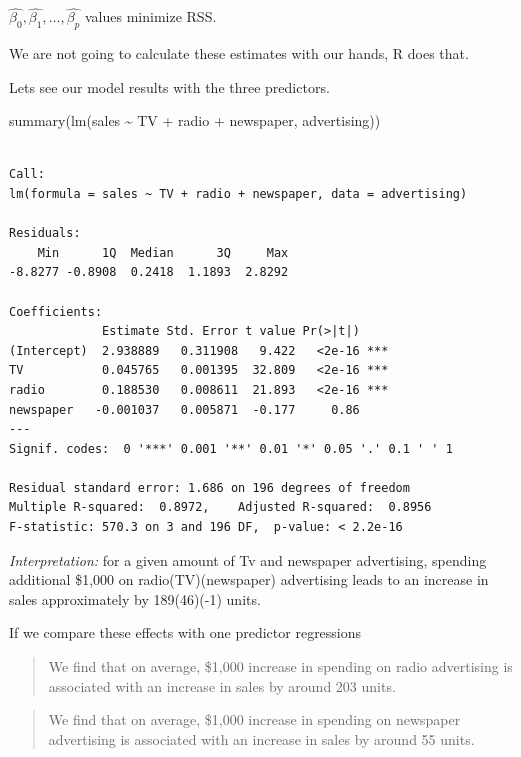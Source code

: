 \documentclass[
  letterpaper,
  DIV=11,
  numbers=noendperiod]{scrreprt}
\newenvironment{Shaded}{\begin{snugshade}}{\end{snugshade}}
\newcommand{\FunctionTok}[1]{\textcolor[rgb]{0.28,0.35,0.67}{#1}}
\newcommand{\NormalTok}[1]{\textcolor[rgb]{0.00,0.23,0.31}{#1}}
\newcommand{\SpecialCharTok}[1]{\textcolor[rgb]{0.37,0.37,0.37}{#1}}
\begin{document}
\(\hat{\beta_0}, \hat{\beta_1},\dots, \hat{\beta_p}\) values minimize
RSS.

We are not going to calculate these estimates with our hands, R does
that.

Lets see our model results with the three predictors.

\begin{Shaded}
\begin{Highlighting}[]
\FunctionTok{summary}\NormalTok{(}\FunctionTok{lm}\NormalTok{(sales }\SpecialCharTok{\textasciitilde{}}\NormalTok{ TV }\SpecialCharTok{+}\NormalTok{ radio }\SpecialCharTok{+}\NormalTok{ newspaper, advertising))}
\end{Highlighting}
\end{Shaded}

\begin{verbatim}

Call:
lm(formula = sales ~ TV + radio + newspaper, data = advertising)

Residuals:
    Min      1Q  Median      3Q     Max 
-8.8277 -0.8908  0.2418  1.1893  2.8292 

Coefficients:
             Estimate Std. Error t value Pr(>|t|)    
(Intercept)  2.938889   0.311908   9.422   <2e-16 ***
TV           0.045765   0.001395  32.809   <2e-16 ***
radio        0.188530   0.008611  21.893   <2e-16 ***
newspaper   -0.001037   0.005871  -0.177     0.86    
---
Signif. codes:  0 '***' 0.001 '**' 0.01 '*' 0.05 '.' 0.1 ' ' 1

Residual standard error: 1.686 on 196 degrees of freedom
Multiple R-squared:  0.8972,    Adjusted R-squared:  0.8956 
F-statistic: 570.3 on 3 and 196 DF,  p-value: < 2.2e-16
\end{verbatim}

\emph{Interpretation:} for a given amount of Tv and newspaper
advertising, spending additional \$1,000 on radio(TV)(newspaper)
advertising leads to an increase in sales approximately by 189(46)(-1)
units.

If we compare these effects with one predictor regressions

\begin{quote}
We find that on average, \$1,000 increase in spending on radio
advertising is associated with an increase in sales by around 203 units.
\end{quote}

\begin{quote}
We find that on average, \$1,000 increase in spending on newspaper
advertising is associated with an increase in sales by around 55 units.
\end{quote}
\end{document}
